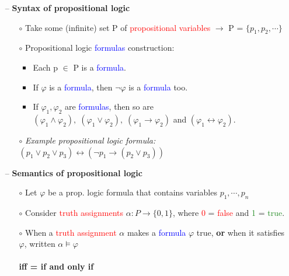 \begin{itemize}
    \item[--] \textbf{Syntax of propositional logic}
    \begin{itemize}
        \item[$\circ$] Take some (infinite) set P of \textcolor{red}{propositional variables} $\rightarrow$ P = $\{p_1, p_2, \cdots \}$
        \item[$\circ$] Propositional logic \textcolor{blue}{formulas} construction:
        \begin{itemize}
            \item Each p $\in$ P is a \textcolor{blue}{formula}.
            \item If $\varphi$ is a \textcolor{blue}{formula}, then $\neg \varphi$ is a \textcolor{blue}{formula} too.
            \item If $\varphi_1, \varphi_2$ are \textcolor{blue}{formulas}, then so are $(\varphi_1 \wedge \varphi_2), \; (\varphi_1 \vee \varphi_2), \; (\varphi_1 \rightarrow \varphi_2)$ and $(\varphi_1 \leftrightarrow \varphi_2)$.
        \end{itemize}
        \item[$\circ$] \textit{Example propositional logic formula:}
        $(p_1 \vee p_2 \vee p_3) \leftrightarrow \left(\neg p_1 \rightarrow (p_2 \vee p_3)\right)$
    \end{itemize}
    \item[--] \textbf{Semantics of propositional logic}
    \begin{itemize}
        \item[$\circ$] Let $\varphi$ be a prop. logic formula that contains variables $p_1, \cdots, p_n$
        \item[$\circ$] Consider \textcolor{red}{truth assignments} $\alpha: P \rightarrow \{0,1\}$, where \textcolor{red}{0} = \textcolor{red}{false} and \textcolor{ForestGreen}{1} = \textcolor{ForestGreen}{true}.
        \item[$\circ$] When a \textcolor{red}{truth assignment} $\alpha$ makes a \textcolor{blue}{formula} $\varphi$ true, \textbf{or} when it satisfies $\varphi$, written $\alpha \models \varphi$ \\
        \\
        \textbf{iff = if and only if} \\
        \begin{minipage}{.45\textwidth}
        \vspace{0.15cm}
            \begin{itemize}

\end{itemize}
\end{minipage}
\end{itemize}
\end{itemize}
